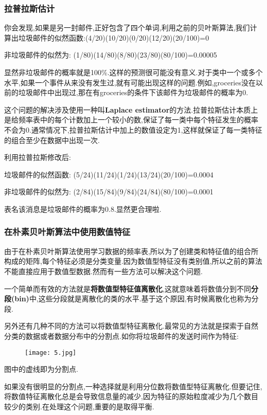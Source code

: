 \documentclass[11pt,a4paper,oneside]{book}
\begin{document}
\subsubsection{拉普拉斯估计}
你会发现,如果是另一封邮件,正好包含了四个单词,利用之前的贝叶斯算法,我们计算出垃圾邮件的似然函数:(4/20)(10/20)(0/20)(12/20)(20/100)=0

非垃圾邮件的似然为: (1/80)(14/80)(8/80)(23/80)(80/100)=0.00005

显然非垃圾邮件的概率就是100\%.这样的预测很可能没有意义.对于类中一个或多个水平,如果一个事件从来没有发生过,就有可能出现这样的问题.例如,groceries没在以前的垃圾邮件中出现过,那在有groceries的条件下该邮件为垃圾邮件的概率为0.

这个问题的解决涉及使用一种叫\textbf{Laplace estimator}的方法.拉普拉斯估计本质上是给频率表中的每个计数加上一个较小的数,保证了每一类中每个特征发生的概率不会为0.通常情况下,拉普拉斯估计中加上的数值设定为1,这样就保证了每一类特征的组合至少在数据中出现一次.

利用拉普拉斯修改后:

垃圾邮件的似然函数: (5/24)(11/24)(1/24)(13/24)(20/100)=0.0004

非垃圾邮件的似然为: (2/84)(15/84)(9/84)(24/84)(80/100)=0.0001

表名该消息是垃圾邮件的概率为0.8.显然更合理啦.

\subsubsection{在朴素贝叶斯算法中使用数值特征}

由于在朴素贝叶斯算法使用学习数据的频率表,所以为了创建类和特征值的组合所构成的矩阵,每个特征必须是分类变量.因为数值型特征没有类别值,所以之前的算法不能直接应用于数值型数据.然而有一些方法可以解决这个问题.

一个简单而有效的方法就是\textbf{将数值型特征值离散化},这就意味着将数值分到不同\textbf{分段(bin)}中,这些分段就是离散化的类的水平.基于这个原因,有时候离散化也称为分段.

另外还有几种不同的方法可以将数值型特征离散化.最常见的方法就是探索于自然分类的数据或者数据分布中的分割点.如你将垃圾邮件的发送时间作为特征:
\begin{figure}[H]
	\centering
	\texttt{[image: 5.jpg]}
\end{figure}
图中的虚线即为分割点.
\begin{tcolorbox}[colback=pink!10!white,colframe=pink!100!black]
如果没有很明显的分割点,一种选择就是利用分位数将数值型特征离散化.但要记住,将数值特征离散化总是会导致信息量的减少,因为特征的原始粒度减少为几个数目较少的类别.在处理这个问题,重要的是取得平衡.
\end{tcolorbox}
\end{document}
